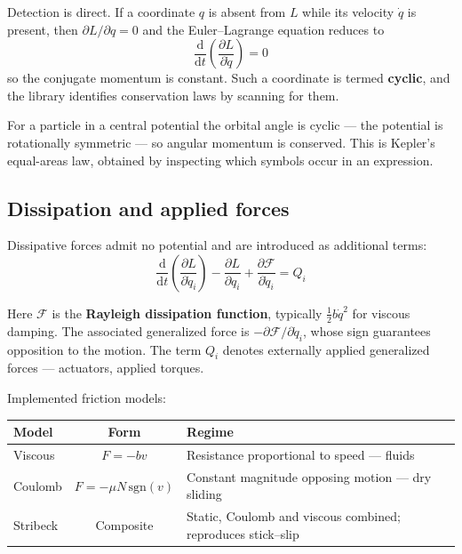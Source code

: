 \documentclass[11pt,a4paper]{article}
\newcommand{\ud}{\mathrm{d}}
\newcommand{\dd}[2]{\frac{\partial #1}{\partial #2}}
\newcommand{\ddt}[1]{\frac{\ud #1}{\ud t}}
\begin{document}
Detection is direct. If a coordinate $q$ is absent from $L$ while its velocity $\dot q$ is present,
then $\partial L/\partial q = 0$ and the Euler--Lagrange equation reduces to
\begin{equation}
\ddt{}\left(\dd{L}{\dot q}\right) = 0
\end{equation}
so the conjugate momentum is constant. Such a coordinate is termed \textbf{cyclic}, and the library
identifies conservation laws by scanning for them.

For a particle in a central potential the orbital angle is cyclic --- the potential is rotationally
symmetric --- so angular momentum is conserved. This is Kepler's equal-areas law, obtained by
inspecting which symbols occur in an expression.

\subsection{Dissipation and applied forces}
\label{sec:dissipation}

Dissipative forces admit no potential and are introduced as additional terms:
\begin{equation}
\ddt{}\left(\dd{L}{\dot q_i}\right) - \dd{L}{q_i} + \dd{\mathcal{F}}{\dot q_i} = Q_i
\end{equation}

Here $\mathcal{F}$ is the \textbf{Rayleigh dissipation function}, typically $\tfrac{1}{2}b\dot q^2$
for viscous damping. The associated generalized force is $-\partial\mathcal{F}/\partial\dot q_i$,
whose sign guarantees opposition to the motion. The term $Q_i$ denotes externally applied generalized
forces --- actuators, applied torques.

Implemented friction models:

\begin{center}
\begin{tabular}{@{}lcL{6.6cm}@{}}
\toprule
\textbf{Model} & \textbf{Form} & \textbf{Regime} \\
\midrule
Viscous  & $F = -bv$                      & Resistance proportional to speed --- fluids \\
Coulomb  & $F = -\mu N \,\mathrm{sgn}(v)$ & Constant magnitude opposing motion --- dry sliding \\
Stribeck & Composite                      & Static, Coulomb and viscous combined; reproduces stick--slip \\
\bottomrule
\end{tabular}
\end{center}
\end{document}
